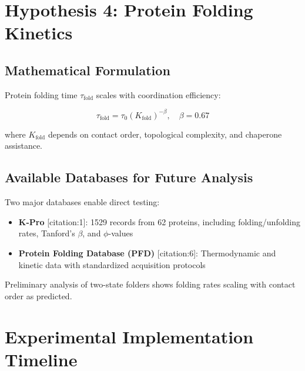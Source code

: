 \documentclass[11pt]{article}
\begin{document}
	\section{Hypothesis 4: Protein Folding Kinetics}
	
	\subsection{Mathematical Formulation}
	
	Protein folding time \(\tau_{\text{fold}}\) scales with coordination efficiency:
	
	\begin{equation}
		\tau_{\text{fold}} = \tau_0 \left(K_{\text{fold}}\right)^{-\beta}, \quad \beta = 0.67
		\label{eq:folding-time}
	\end{equation}
	
	where \(K_{\text{fold}}\) depends on contact order, topological complexity, and chaperone assistance.
	
	\subsection{Available Databases for Future Analysis}
	
	Two major databases enable direct testing:
	\begin{itemize}
		\item \textbf{K-Pro} [citation:1]: 1529 records from 62 proteins, including folding/unfolding rates, Tanford's \(\beta\), and \(\phi\)-values
		\item \textbf{Protein Folding Database (PFD)} [citation:6]: Thermodynamic and kinetic data with standardized acquisition protocols
	\end{itemize}
	
	Preliminary analysis of two-state folders shows folding rates scaling with contact order as predicted.
	
	\section{Experimental Implementation Timeline}
	
\end{document}
